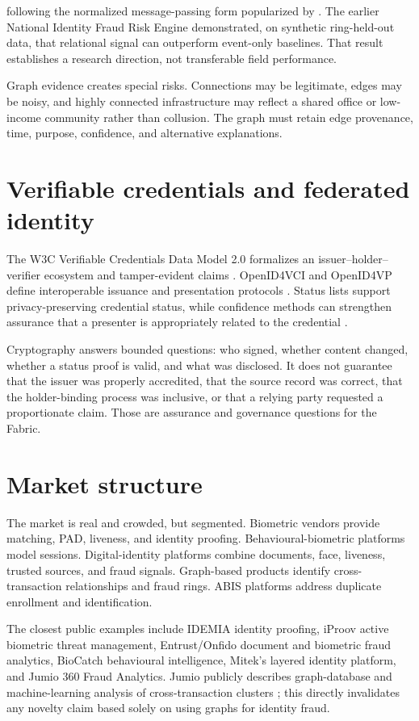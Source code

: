 following the normalized message-passing form popularized by \citet{kipf2017semi}. The earlier National Identity Fraud Risk Engine demonstrated, on synthetic ring-held-out data, that relational signal can outperform event-only baselines. That result establishes a research direction, not transferable field performance.

Graph evidence creates special risks. Connections may be legitimate, edges may be noisy, and highly connected infrastructure may reflect a shared office or low-income community rather than collusion. The graph must retain edge provenance, time, purpose, confidence, and alternative explanations.

\section{Verifiable credentials and federated identity}

The W3C Verifiable Credentials Data Model 2.0 formalizes an issuer--holder--verifier ecosystem and tamper-evident claims \citep{w3cvc2025}. OpenID4VCI and OpenID4VP define interoperable issuance and presentation protocols \citep{openid4vci2025,openid4vp2025}. Status lists support privacy-preserving credential status, while confidence methods can strengthen assurance that a presenter is appropriately related to the credential \citep{w3cstatus2025,w3cconfidence2026}.

Cryptography answers bounded questions: who signed, whether content changed, whether a status proof is valid, and what was disclosed. It does not guarantee that the issuer was properly accredited, that the source record was correct, that the holder-binding process was inclusive, or that a relying party requested a proportionate claim. Those are assurance and governance questions for the Fabric.

\section{Market structure}

The market is real and crowded, but segmented. Biometric vendors provide matching, PAD, liveness, and identity proofing. Behavioural-biometric platforms model sessions. Digital-identity platforms combine documents, face, liveness, trusted sources, and fraud signals. Graph-based products identify cross-transaction relationships and fraud rings. ABIS platforms address duplicate enrollment and identification.

The closest public examples include IDEMIA identity proofing, iProov active biometric threat management, Entrust/Onfido document and biometric fraud analytics, BioCatch behavioural intelligence, Mitek's layered identity platform, and Jumio 360 Fraud Analytics. Jumio publicly describes graph-database and machine-learning analysis of cross-transaction clusters \citep{jumio360}; this directly invalidates any novelty claim based solely on using graphs for identity fraud.


